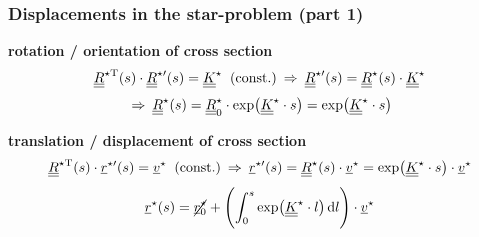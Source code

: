 \begin{frame}
  \frametitle{Displacements in the star-problem (part 1)}

  \textbf{rotation / orientation of cross section}
  \begin{displaymath}
    \underline{\underline{R}}^{\star \mathrm{T}}(s) \cdot \underline{\underline{R}}^{\star \prime}(s) = \underline{\underline{K}}^{\star} \: \text{ (const.)}
    \: \Rightarrow \:
    \underline{\underline{R}}^{\star \prime}(s) = \underline{\underline{R}}^{\star}(s) \cdot \underline{\underline{K}}^{\star}
  \end{displaymath}
  \begin{displaymath}
    \: \Rightarrow \:
    \underline{\underline{R}}^{\star}(s) = \underline{\underline{R}}^{\star}_0 \cdot \exp \bigl( \underline{\underline{K}}^{\star} \cdot s \bigr) = \exp \bigl( \underline{\underline{K}}^{\star} \cdot s \bigr)
  \end{displaymath}
  
  \vspace{1.5em}
  \textbf{translation / displacement of cross section}
  \begin{displaymath}
    \underline{\underline{R}}^{\star \mathrm{T}}(s) \cdot \underline{r}^{\star \prime}(s) = \underline{v}^{\star} \: \text{ (const.)}
    \: \Rightarrow \:
    \underline{r}^{\star \prime}(s) = \underline{\underline{R}}^{\star}(s) \cdot \underline{v}^{\star} =
    \exp \bigl( \underline{\underline{K}}^{\star} \cdot s \bigr) \cdot \underline{v}^{\star}
  \end{displaymath}
  \begin{displaymath}
    \underline{r}^{\star}(s) = \cancel{ \underline{r}^{\star}_0 } + \Biggl( \int_0^s \exp \bigl( \doubleunderline{K}^{\star} \cdot l \bigr) \dif l \Biggr) \cdot \underline{v}^{\star}
  \end{displaymath}
  
\end{frame}


